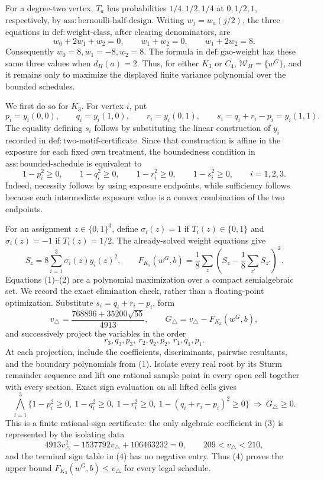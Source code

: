 For a degree-two vertex, \(T_a\) has probabilities \(1/4,1/2,1/4\) at \(0,1/2,1\), respectively, by \(\mathrm{ass:bernoulli\text{-}half\text{-}design}\).  Writing \(w_j=w_a(j/2)\), the three equations in \(\mathrm{def:weight\text{-}class}\), after clearing denominators, are
\[
w_0+2w_1+w_2=0,\qquad w_1+w_2=0,\qquad w_1+2w_2=8.
\]
Consequently \(w_0=8,w_1=-8,w_2=8\).  The formula in \(\mathrm{def:gao\text{-}weight}\) has these same three values when \(d_H(a)=2\).  Thus, for either \(K_3\) or \(C_4\), \(\mathcal W_H=\{w^G\}\), and it remains only to maximize the displayed finite variance polynomial over the bounded schedules.

We first do so for \(K_3\).  For vertex \(i\), put
\[
p_i=y_i(0,0),\qquad q_i=y_i(1,0),\qquad r_i=y_i(0,1),\qquad s_i=q_i+r_i-p_i=y_i(1,1).
\]
The equality defining \(s_i\) follows by substituting the linear construction of \(y_i\) recorded in \(\mathrm{def:two\text{-}motif\text{-}certificate}\).  Since that construction is affine in the exposure for each fixed own treatment, the boundedness condition in \(\mathrm{ass:bounded\text{-}schedule}\) is equivalent to
\[
1-p_i^2\ge0,\qquad 1-q_i^2\ge0,\qquad 1-r_i^2\ge0,\qquad 1-s_i^2\ge0,\qquad i=1,2,3. \tag{1}
\]
Indeed, necessity follows by using exposure endpoints, while sufficiency follows because each intermediate exposure value is a convex combination of the two endpoints.

For an assignment \(z\in\{0,1\}^3\), define \(\sigma_i(z)=1\) if \(T_i(z)\in\{0,1\}\) and \(\sigma_i(z)=-1\) if \(T_i(z)=1/2\).  The already-solved weight equations give
\[
S_z=8\sum_{i=1}^3\sigma_i(z)y_i(z)^2,\qquad
F_{K_3}(w^G,b)=\frac18\sum_z\left(S_z-\frac18\sum_{z'}S_{z'}\right)^2. \tag{2}
\]
Equations (1)--(2) are a polynomial maximization over a compact semialgebraic set.  We record the exact elimination check, rather than a floating-point optimization.  Substitute \(s_i=q_i+r_i-p_i\), form
\[
v_\triangle=\frac{768896+35200\sqrt{55}}{4913},\qquad
G_\triangle=v_\triangle-F_{K_3}(w^G,b), \tag{3}
\]
and successively project the variables in the order
\[
r_3,q_3,p_3,\ r_2,q_2,p_2,\ r_1,q_1,p_1.
\]
At each projection, include the coefficients, discriminants, pairwise resultants, and the boundary polynomials from (1).  Isolate every real root by its Sturm remainder sequence and lift one rational sample point in every open cell together with every section.  Exact sign evaluation on all lifted cells gives
\[
\bigwedge_{i=1}^3\{1-p_i^2\ge0,\ 1-q_i^2\ge0,\ 1-r_i^2\ge0,\ 1-(q_i+r_i-p_i)^2\ge0\}\ \Longrightarrow\ G_\triangle\ge0. \tag{4}
\]
This is a finite rational-sign certificate: the only algebraic coefficient in (3) is represented by the isolating data
\[
4913v_\triangle^2-1537792v_\triangle+106463232=0,\qquad 209<v_\triangle<210, \tag{5}
\]
and the terminal sign table in (4) has no negative entry.  Thus (4) proves the upper bound \(F_{K_3}(w^G,b)\le v_\triangle\) for every legal schedule.

